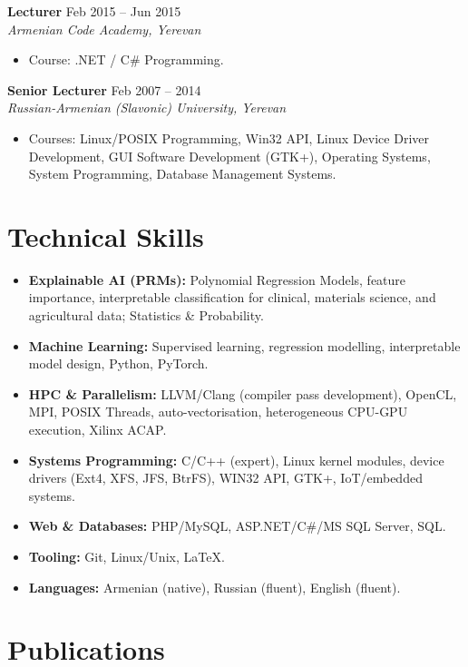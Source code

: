 \documentclass[a4paper,12pt]{article}
\newcommand{\role}[3]{%
  \par\vspace{7pt}\noindent\textbf{#1} \hfill \small\textnormal{#2} \\
  \textit{\small #3}\par\vspace{3pt}%
}
\begin{document}
\role{Lecturer}{Feb 2015 -- Jun 2015}{Armenian Code Academy, Yerevan}
\begin{itemize}[leftmargin=*, noitemsep, topsep=0pt]
  \item Course: .NET / C\# Programming.
\end{itemize}

\role{Senior Lecturer}{Feb 2007 -- 2014}{Russian-Armenian (Slavonic) University, Yerevan}
\begin{itemize}[leftmargin=*, noitemsep, topsep=0pt]
  \item Courses: Linux/POSIX Programming, Win32 API, Linux Device Driver Development, GUI Software
        Development (GTK+), Operating Systems, System Programming, Database Management Systems.
\end{itemize}

\section*{Technical Skills}
\begin{itemize}[leftmargin=*, itemsep=4pt, topsep=3pt]
  \item \textbf{Explainable AI (PRMs):} Polynomial Regression Models, feature importance,
        interpretable classification for clinical, materials science, and agricultural data; Statistics \& Probability.
  \item \textbf{Machine Learning:} Supervised learning, regression modelling, interpretable model design, Python, PyTorch.
  \item \textbf{HPC \& Parallelism:} LLVM/Clang (compiler pass development), OpenCL, MPI, POSIX Threads,
        auto-vectorisation, heterogeneous CPU-GPU execution, Xilinx ACAP.
  \item \textbf{Systems Programming:} C/C++ (expert), Linux kernel modules, device drivers (Ext4, XFS, JFS, BtrFS),
        WIN32 API, GTK+, IoT/embedded systems.
  \item \textbf{Web \& Databases:} PHP/MySQL, ASP.NET/C\#/MS SQL Server, SQL.
  \item \textbf{Tooling:} Git, Linux/Unix, \LaTeX.
  \item \textbf{Languages:} Armenian (native), Russian (fluent), English (fluent).
\end{itemize}

\section*{Publications}
\end{document}
